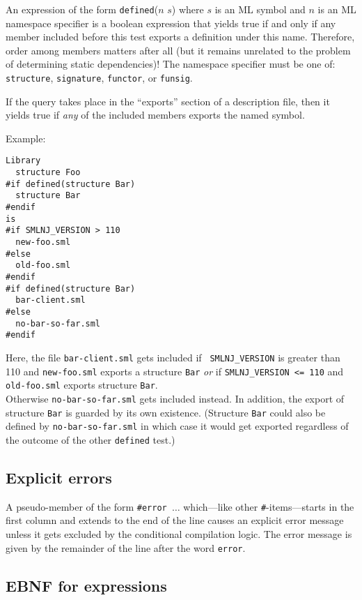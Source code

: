 \documentclass{article}
\begin{document}
An expression of the form {\tt defined}($n$ $s$) where $s$ is an ML
symbol and $n$ is an ML namespace specifier is a boolean expression
that yields true if and only if any member included before this test
exports a definition under this name.  Therefore, order among members
matters after all (but it remains unrelated to the problem of
determining static dependencies)!  The namespace specifier must be one
of: {\tt structure}, {\tt signature}, {\tt functor}, or {\tt funsig}.

If the query takes place in the ``exports'' section of a description
file, then it yields true if {\em any} of the included members exports
the named symbol.

\noindent Example:

\begin{verbatim}
Library
  structure Foo
#if defined(structure Bar)
  structure Bar
#endif
is
#if SMLNJ_VERSION > 110
  new-foo.sml
#else
  old-foo.sml
#endif
#if defined(structure Bar)
  bar-client.sml
#else
  no-bar-so-far.sml
#endif
\end{verbatim}

Here, the file {\tt bar-client.sml} gets included if {\tt
SMLNJ\_VERSION} is greater than 110 and {\tt new-foo.sml} exports a
structure {\tt Bar} {\em or} if {\tt SMLNJ\_VERSION <= 110} and {\tt
old-foo.sml} exports structure {\tt Bar}. \\
Otherwise {\tt no-bar-so-far.sml} gets included instead.  In addition,
the export of structure {\tt Bar} is guarded by its own existence.
(Structure {\tt Bar} could also be defined by {\tt no-bar-so-far.sml}
in which case it would get exported regardless of the outcome of the
other {\tt defined} test.)

\subsection{Explicit errors}

A pseudo-member of the form {\tt \#error $\ldots$} which---like other
{\tt \#}-items---starts in the first column and extends to the end of
the line causes an explicit error message unless it gets excluded by
the conditional compilation logic.  The error message is given by the
remainder of the line after the word {\tt error}.

\subsection{EBNF for expressions}
\end{document}
